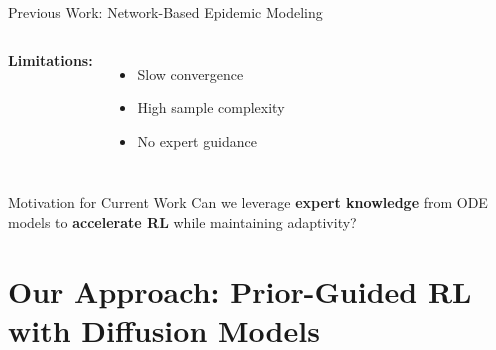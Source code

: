 \documentclass[aspectratio=169]{beamer}
\begin{document}
\begin{frame}{Previous Work: Network-Based Epidemic Modeling}
\begin{columns}

\vspace{1em}
\textbf{Limitations:}
\begin{itemize}
    \item \alert{Slow convergence}
    \item \alert{High sample complexity}
    \item \alert{No expert guidance}
\end{itemize}

\end{columns}

\vspace{1em}
\begin{block}{Motivation for Current Work}
Can we leverage \textbf{expert knowledge} from ODE models to \textbf{accelerate RL} while maintaining adaptivity?
\end{block}

\end{frame}

\section{Our Approach: Prior-Guided RL with Diffusion Models}
\end{document}
